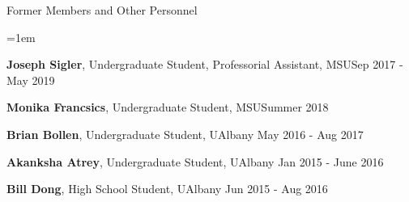 \documentclass{resume} %
\begin{document}
\begin{rSection}{Former Members and Other Personnel}
\begin{list}{}{\leftmargin=1em}
   \item \textbf{Joseph Sigler}, Undergraduate Student, Professorial Assistant, MSU\hfill Sep 2017 - May 2019

   \item \textbf{Monika Francsics}, Undergraduate Student, MSU\hfill Summer 2018

   \item \textbf{Brian Bollen}, Undergraduate Student, UAlbany \hfill May 2016 - Aug 2017

   \item \textbf{Akanksha Atrey}, Undergraduate Student, UAlbany \hfill Jan 2015 - June 2016

   \item \textbf{Bill Dong}, High School Student, UAlbany \hfill Jun 2015 - Aug 2016
\end{list}

\end{rSection}
\end{document}
